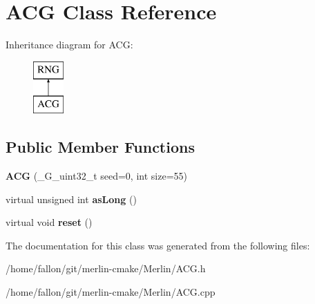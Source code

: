 \hypertarget{classACG}{}\section{A\+CG Class Reference}
\label{classACG}
Inheritance diagram for A\+CG\+:\begin{figure}[H]
\begin{center}
\leavevmode
\includegraphics[height=2.000000cm]{classACG}
\end{center}
\end{figure}
\subsection*{Public Member Functions}
\begin{DoxyCompactItemize}
\item 
\mbox{\label{classACG_ab574de6ba1590b838b3235fefb503041}} 
{\bfseries A\+CG} (\+\_\+\+G\+\_\+uint32\+\_\+t seed=0, int size=55)
\item 
\mbox{\label{classACG_ab2fa5f8178d29fe1f3d97529fa439df3}} 
virtual unsigned int {\bfseries as\+Long} ()
\item 
\mbox{\label{classACG_a8cae86432d64c79199acb140019a0c6f}} 
virtual void {\bfseries reset} ()
\end{DoxyCompactItemize}


The documentation for this class was generated from the following files\+:\begin{DoxyCompactItemize}
\item 
/home/fallon/git/merlin-\/cmake/\+Merlin/A\+C\+G.\+h\item 
/home/fallon/git/merlin-\/cmake/\+Merlin/A\+C\+G.\+cpp\end{DoxyCompactItemize}
